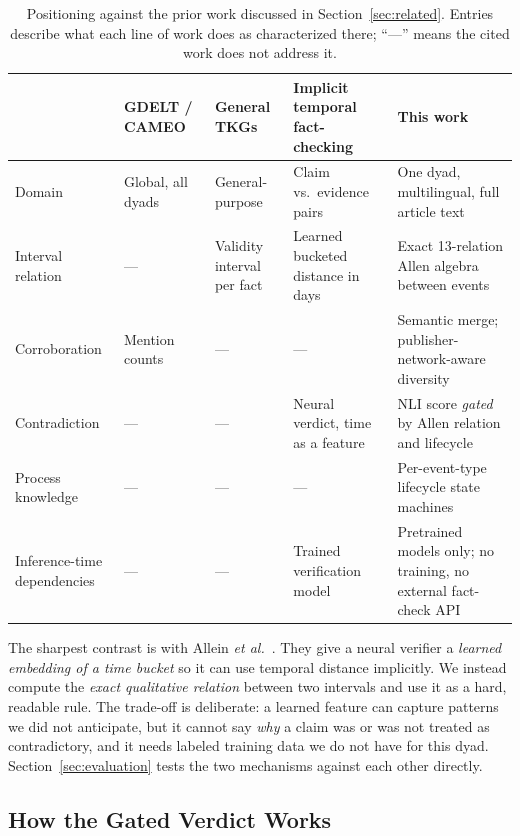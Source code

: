 \begin{table}[t]
\caption{Positioning against the prior work discussed in
Section~\ref{sec:related}. Entries describe what each line of work does as
characterized there; ``---'' means the cited work does not address it.}
\label{tab:positioning}
\centering
\small
\begin{tabular}{p{2.6cm}p{3.2cm}p{3.4cm}p{3.4cm}p{3.4cm}}
\toprule
 & \textbf{GDELT / CAMEO}~\cite{leetaru2013gdelt,gerner2002cameo}
 & \textbf{General TKGs}~\cite{gottschalk2019eventkg,jain2020timeplex}
 & \textbf{Implicit temporal fact-checking}~\cite{allein2023implicit}
 & \textbf{This work} \\
\midrule
Domain
 & Global, all dyads
 & General-purpose
 & Claim vs.\ evidence pairs
 & One dyad, multilingual, full article text \\
Interval relation
 & ---
 & Validity interval per fact
 & Learned bucketed distance in days
 & Exact 13-relation Allen algebra between events \\
Corroboration
 & Mention counts
 & ---
 & ---
 & Semantic merge; publisher-network-aware diversity \\
Contradiction
 & ---
 & ---
 & Neural verdict, time as a feature
 & NLI score \emph{gated} by Allen relation and lifecycle \\
Process knowledge
 & ---
 & ---
 & ---
 & Per-event-type lifecycle state machines \\
Inference-time dependencies
 & ---
 & ---
 & Trained verification model
 & Pretrained models only; no training, no external fact-check API \\
\bottomrule
\end{tabular}
\end{table}

The sharpest contrast is with Allein \textit{et al.}~\cite{allein2023implicit}.
They give a neural verifier a \emph{learned embedding of a time bucket} so it
can use temporal distance implicitly. We instead compute the \emph{exact
qualitative relation} between two intervals and use it as a hard, readable
rule. The trade-off is deliberate: a learned feature can capture patterns we
did not anticipate, but it cannot say \emph{why} a claim was or was not
treated as contradictory, and it needs labeled training data we do not have
for this dyad. Section~\ref{sec:evaluation} tests the two mechanisms against
each other directly.

\subsection{How the Gated Verdict Works}

